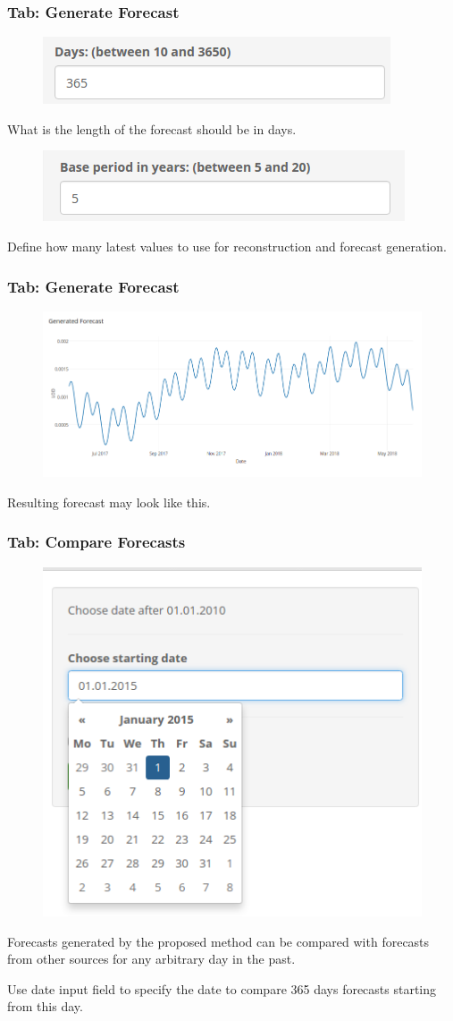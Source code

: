 \documentclass[pdf, unicode, notheorems, xcolor={table}]{beamer}
\begin{document}
\begin{frame}\frametitle{Tab: Generate Forecast}
	\begin{figure}
		\includegraphics[width=0.9 \linewidth]{number_of_days}
	\end{figure}
	What is the length of the forecast should be in days.
	
	\begin{figure}
		\includegraphics[width=0.9 \linewidth]{base_period}
	\end{figure}
	Define how many latest values to use for reconstruction and forecast generation.
	
\end{frame}

\begin{frame}\frametitle{Tab: Generate Forecast}
	\begin{figure}
		\includegraphics[width=0.8 \linewidth]{generate_result}
	\end{figure}
	Resulting forecast may look like this.
\end{frame}

\begin{frame}\frametitle{Tab: Compare Forecasts}
	\begin{figure}
		\includegraphics[width=0.4 \linewidth]{compare_date}
	\end{figure}
	Forecasts generated by the proposed method can be compared with forecasts from other sources for any arbitrary day in the past.
	
	Use date input field to specify the date to compare 365 days forecasts starting from this day.
\end{frame}
\end{document}
